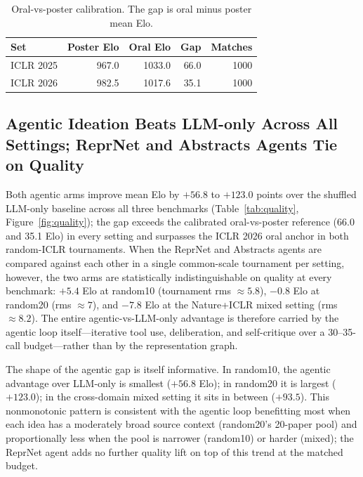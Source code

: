 \documentclass[10pt,twocolumn]{article}
\begin{document}
\begin{table}[t]
\centering
\small
\begin{tabular}{lrrrr}
\toprule
Set & Poster Elo & Oral Elo & Gap & Matches \\
\midrule
ICLR 2025 & 967.0 & 1033.0 & 66.0 & 1000 \\
ICLR 2026 & 982.5 & 1017.6 & 35.1 & 1000 \\
\bottomrule
\end{tabular}
\caption{Oral-vs-poster calibration.  The gap is oral minus poster mean Elo.}
\label{tab:calibration}
\end{table}

\subsection{Agentic Ideation Beats LLM-only Across All Settings; ReprNet and Abstracts Agents Tie on Quality}

Both agentic arms improve mean Elo by $+56.8$ to $+123.0$ points over
the shuffled LLM-only baseline across all three benchmarks
(Table~\ref{tab:quality}, Figure~\ref{fig:quality}); the gap exceeds
the calibrated oral-vs-poster reference (66.0 and 35.1 Elo) in every
setting and surpasses the ICLR 2026 oral anchor in both random-ICLR
tournaments.  When the ReprNet and Abstracts agents are compared against each other
in a single common-scale tournament per setting, however, the two
arms are statistically indistinguishable on quality at every
benchmark: $+5.4$ Elo at random10 (tournament rms $\approx 5.8$),
$-0.8$ Elo at random20 (rms $\approx 7$), and $-7.8$ Elo at the
Nature+ICLR mixed setting (rms $\approx 8.2$).  The entire
agentic-vs-LLM-only advantage is therefore carried by the agentic loop
itself---iterative tool use, deliberation, and self-critique over a
30--35-call budget---rather than by the representation graph.

The shape of the agentic gap is itself informative.  In random10, the
agentic advantage over LLM-only is smallest ($+56.8$ Elo); in random20
it is largest ($+123.0$); in the cross-domain mixed setting it sits in
between ($+93.5$).  This nonmonotonic pattern is consistent with the
agentic loop benefitting most when each idea has a moderately broad
source context (random20's 20-paper pool) and proportionally less when
the pool is narrower (random10) or harder (mixed); the ReprNet agent adds no
further quality lift on top of this trend at the matched budget.
\end{document}
